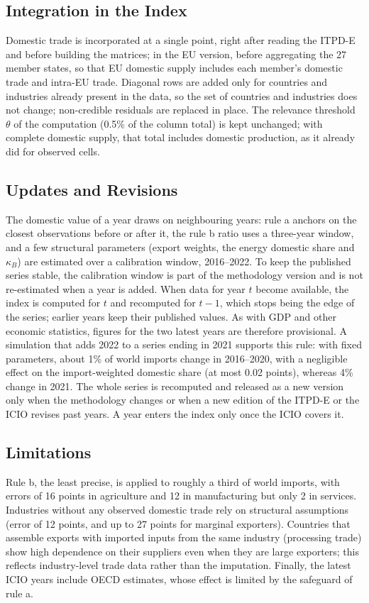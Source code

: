 \documentclass[final,1p,times,authoryear]{elsarticle}
\begin{document}
\subsection{Integration in the Index}
Domestic trade is incorporated at a single point, right after reading the ITPD-E and before building the matrices; in the EU version, before aggregating the 27 member states, so that EU domestic supply includes each member's domestic trade and intra-EU trade. Diagonal rows are added only for countries and industries already present in the data, so the set of countries and industries does not change; non-credible residuals are replaced in place. The relevance threshold $\theta$ of the computation (0.5\% of the column total) is kept unchanged; with complete domestic supply, that total includes domestic production, as it already did for observed cells.

\subsection{Updates and Revisions}\label{subsec:revisions}
The domestic value of a year draws on neighbouring years: rule a anchors on the closest observations before or after it, the rule b ratio uses a three-year window, and a few structural parameters (export weights, the energy domestic share and $\kappa_B$) are estimated over a calibration window, 2016--2022. To keep the published series stable, the calibration window is part of the methodology version and is not re-estimated when a year is added. When data for year $t$ become available, the index is computed for $t$ and recomputed for $t-1$, which stops being the edge of the series; earlier years keep their published values. As with GDP and other economic statistics, figures for the two latest years are therefore provisional. A simulation that adds 2022 to a series ending in 2021 supports this rule: with fixed parameters, about 1\% of world imports change in 2016--2020, with a negligible effect on the import-weighted domestic share (at most 0.02 points), whereas 4\% change in 2021. The whole series is recomputed and released as a new version only when the methodology changes or when a new edition of the ITPD-E or the ICIO revises past years. A year enters the index only once the ICIO covers it.

\subsection{Limitations}
Rule b, the least precise, is applied to roughly a third of world imports, with errors of 16 points in agriculture and 12 in manufacturing but only 2 in services. Industries without any observed domestic trade rely on structural assumptions (error of 12 points, and up to 27 points for marginal exporters). Countries that assemble exports with imported inputs from the same industry (processing trade) show high dependence on their suppliers even when they are large exporters; this reflects industry-level trade data rather than the imputation. Finally, the latest ICIO years include OECD estimates, whose effect is limited by the safeguard of rule a.
\end{document}
